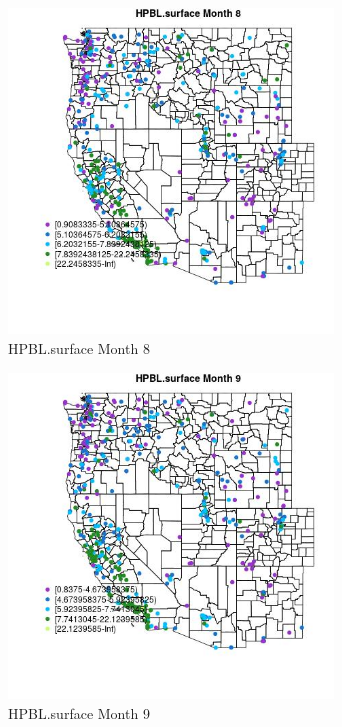 \begin{figure} 
\centering  
\includegraphics[width=0.77\textwidth]{Code_Outputs/ML_input_report_ML_input_PM25_Step5_part_d_de_duplicated_aves_ML_input_MapObsMo8HPBLsurface.jpg} 
\caption{\label{fig:ML_input_report_ML_input_PM25_Step5_part_d_de_duplicated_aves_ML_inputMapObsMo8HPBLsurface}HPBL.surface Month 8} 
\end{figure} 
 

\begin{figure} 
\centering  
\includegraphics[width=0.77\textwidth]{Code_Outputs/ML_input_report_ML_input_PM25_Step5_part_d_de_duplicated_aves_ML_input_MapObsMo9HPBLsurface.jpg} 
\caption{\label{fig:ML_input_report_ML_input_PM25_Step5_part_d_de_duplicated_aves_ML_inputMapObsMo9HPBLsurface}HPBL.surface Month 9} 
\end{figure} 
 


